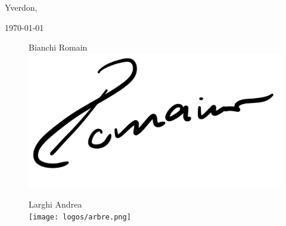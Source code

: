 \documentclass{rapport}
\begin{document}







\fairepagedegarde %
\thispagestyle{noPage}
\tabledematieres %
\thispagestyle{noPage}
\newpage
\listoffigures
\listoftables
\clearpage
\setcounter{page}{1}
\fairemarges %






%





\begin{flushright}
    Yverdon, {\today\par}
\end{flushright}

\begin{figure}[H]
    \centering
    \begin{minipage}[b]{0.3\textwidth}
      \centering
      Bianchi Romain\\
      \includegraphics[height=0.4\textwidth]{Images/Bianchi.jpg}
    \end{minipage}
    \hfill
    \begin{minipage}[b]{0.3\textwidth}
      \centering
      Larghi Andrea\\
      \texttt{[image: logos/arbre.png]}
    \end{minipage}
  \end{figure}

\newpage
\printbibliography %


\newpage
\appendix

% 

\end{document}
